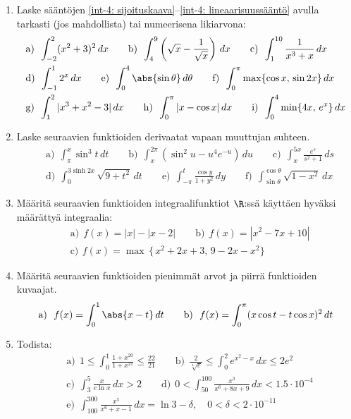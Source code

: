 \begin{enumerate}
\item
Laske sääntöjen \eqref{int-4: sijoituskaava}--\eqref{int-4: lineaarisuussääntö} avulla tarkasti
(jos mahdollista) tai numeerisena likiarvona:
\begin{align*}
&\text{a)}\,\ \int_{-2}^2 (x^2+3)^2\,dx \qquad
 \text{b)}\,\ \int_4^9 \left(\sqrt{x}-\frac{1}{\sqrt{x}}\right)\,dx \qquad
 \text{c)}\,\ \int_{1}^{10} \frac{1}{x^3+x}\,dx \\
&\text{d)}\,\ \int_{-1}^1 2^x\,dx \qquad
 \text{e)}\,\ \int_0^4 \abs{\sin\theta}\,d\theta \qquad
 \text{f)}\,\ \int_0^\pi \max\{\cos x,\,\sin 2x\}\,dx \\
&\text{g)}\,\ \int_1^2|x^3+x^2-3|\,dx \qquad
 \text{h)}\,\ \int_0^\pi|x-\cos x|\,dx \qquad
 \text{i)}\,\ \int_0^4 \min\{4x,\,e^x\}\,dx
\end{align*}

\item
Laske seuraavien funktioiden derivaatat vapaan muuttujan suhteen.
\begin{align*}
&\text{a)}\ \ \int_\pi^x \sin^3 t\,dt \qquad
 \text{b)}\ \ \int_x^{2\pi}(\sin^2u-u^4 e^{-u})\,du \qquad
 \text{c)}\ \ \int_{x}^{5x} \frac{e^s}{s^2+1}\,ds \\
&\text{d)}\ \ \int_0^{3\sinh 2x} \sqrt{9+t^2}\,dt \qquad
 \text{e)}\ \ \int_{-\pi}^t \frac{\cos y}{1+y^2}\,dy \qquad
 \text{f)}\ \ \int_{\sin\theta}^{\cos\theta} \sqrt{1-x^2}\,dx
\end{align*}

\item
Määritä seuraavien funktioiden integraalifunktiot $\R$:ssä käyttäen hyväksi määrättyä
integraalia:
\begin{align*}
&\text{a)}\ \ f(x)=|x|-|x-2| \qquad
 \text{b)}\ \ f(x)=|x^2-7x+10| \\
&\text{c)}\,\ f(x)=\max\,\{\,x^2+2x+3,\,9-2x-x^2\}
\end{align*}

\item
Määritä seuraavien funktioiden pienimmät arvot ja piirrä funktioiden \newline kuvaajat.
\[
\text{a)}\ \ f(x)=\int_0^1 \abs{x-t}\,dt \qquad
\text{b)}\ \ f(x)=\int_0^\pi (x\cos t-t\cos x)^2\,dt
\]

\item
Todista:
\begin{align*}
&\text{a)}\ \ 1 \le \int_0^1 \frac{1+x^{20}}{1+x^{21}} \le \frac{22}{21} \qquad
 \text{b)}\ \ \frac{2}{\sqrt[4]{e}} \le \int_0^2 e^{x^2-x}\,dx \le 2e^2 \\
&\text{c)}\ \ \int_3^5 \frac{x}{e\ln x}\,dx > 2 \qquad
 \text{d)}\ \ 0 < \int_{50}^{100} \frac{x^3}{x^6+8x+9}\,dx < 1.5 \cdot 10^{-4} \\
&\text{e)}\ \ \int_{100}^{300} \frac{x^5}{x^6+x-1}\,dx 
                               = \ln 3-\delta, \quad 0<\delta<2 \cdot 10^{-11}
\end{align*}


\end{enumerate}
